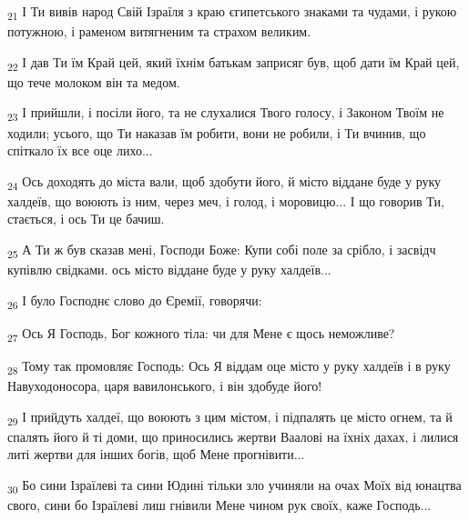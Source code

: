 \begin{tcolorbox}
\textsubscript{21} І Ти вивів народ Свій Ізраїля з краю єгипетського знаками та чудами, і рукою потужною, і раменом витягненим та страхом великим.
\end{tcolorbox}
\begin{tcolorbox}
\textsubscript{22} І дав Ти їм Край цей, який їхнім батькам заприсяг був, щоб дати їм Край цей, що тече молоком він та медом.
\end{tcolorbox}
\begin{tcolorbox}
\textsubscript{23} І прийшли, і посіли його, та не слухалися Твого голосу, і Законом Твоїм не ходили; усього, що Ти наказав їм робити, вони не робили, і Ти вчинив, що спіткало їх все оце лихо...
\end{tcolorbox}
\begin{tcolorbox}
\textsubscript{24} Ось доходять до міста вали, щоб здобути його, й місто віддане буде у руку халдеїв, що воюють із ним, через меч, і голод, і моровицю... І що говорив Ти, стається, і ось Ти це бачиш.
\end{tcolorbox}
\begin{tcolorbox}
\textsubscript{25} А Ти ж був сказав мені, Господи Боже: Купи собі поле за срібло, і засвідч купівлю свідками. ось місто віддане буде у руку халдеїв...
\end{tcolorbox}
\begin{tcolorbox}
\textsubscript{26} І було Господнє слово до Єремії, говорячи:
\end{tcolorbox}
\begin{tcolorbox}
\textsubscript{27} Ось Я Господь, Бог кожного тіла: чи для Мене є щось неможливе?
\end{tcolorbox}
\begin{tcolorbox}
\textsubscript{28} Тому так промовляє Господь: Ось Я віддам оце місто у руку халдеїв і в руку Навуходоносора, царя вавилонського, і він здобуде його!
\end{tcolorbox}
\begin{tcolorbox}
\textsubscript{29} І прийдуть халдеї, що воюють з цим містом, і підпалять це місто огнем, та й спалять його й ті доми, що приносились жертви Ваалові на їхніх дахах, і лилися литі жертви для інших богів, щоб Мене прогнівити...
\end{tcolorbox}
\begin{tcolorbox}
\textsubscript{30} Бо сини Ізраїлеві та сини Юдині тільки зло учиняли на очах Моїх від юнацтва свого, сини бо Ізраїлеві лиш гнівили Мене чином рук своїх, каже Господь...
\end{tcolorbox}
